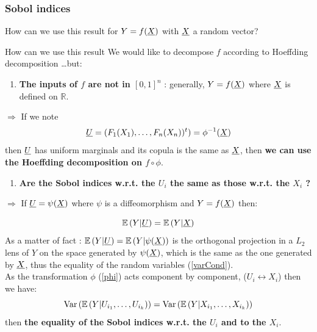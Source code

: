 \documentclass[8pt]{beamer}
\begin{document}
\begin{frame}
\frametitle{Sobol indices}
\small
How can we use this result for $Y = f({\underline{X}})$ with ${\underline{X}}$ a random vector?

\begin{block}{How can we use this result}
    \small
      We would like to decompose $f$ according to Hoeffding decomposition \dots but: \\
      \begin{enumerate}
      \item  \alert{\bf The inputs of $f$ are not in $[0,1]^n$} :  generally, $Y=f({\underline{X}})$ where  ${\underline{X}}$ is defined on $\mathbb{R}$.
      \end{enumerate}
      \alert{$\Longrightarrow$} If we note
       \begin{equation}
         \label{phi}
         {\underline{U}} = (F_1(X_1), \dots, F_n(X_n))^t) = \phi^{-1}({\underline{X}})
       \end{equation}
       then ${\underline{U}}$ has uniform marginals and its copula is the same as ${\underline{X}}$, then {\bf we can use the Hoeffding decomposition on $f \circ \phi$}.

       \begin{enumerate}
       \item  \alert{\bf Are the Sobol indices w.r.t. the  $U_i$ the same as those w.r.t. the $X_i$ ?}
       \end{enumerate}
       \alert{$\Longrightarrow$} If ${\underline{U}} = \psi({\underline{X}})$ where $\psi$ is a diffeomorphism and $Y=f({\underline{X}})$ then:

       \begin{equation}
         \label{varCond}
         \mathbb{E}\left( Y|{\underline{U}} \right) = \mathbb{E}\left( Y|{\underline{X}} \right)
       \end{equation}
       As a matter of fact : $\mathbb{E}\left( Y|{\underline{U}} \right) = \mathbb{E}\left( Y|\psi({\underline{X}}) \right)$ is the orthogonal projection in a $L_2$ lens of $Y$ on the space generated by $\psi({\underline{X}})$, which is the same as the one generated by ${\underline{X}}$, thus the equality of the random variables  (\ref{varCond}).\\
       As the transformation $\phi$ (\ref{phi}) acts component by component, ($U_i \leftrightarrow X_i$) then we have:
       \begin{equation}
         \label{varCond2}
         \mbox{Var}\left( \mathbb{E}\left( Y|U_{i_1}, \dots, U_{i_k} \right) \right) = \mbox{Var}\left( \mathbb{E}\left( Y|X_{i_1}, \dots, X_{i_k} \right) \right)
       \end{equation}
       then {\bf the equality of the Sobol indices w.r.t. the  $U_i$ and to the  $X_i$}.
  \end{block}

\end{frame}
\end{document}

